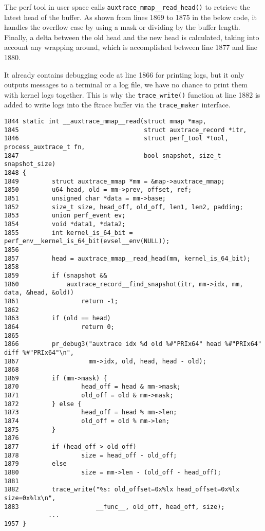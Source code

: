 \documentclass[11pt]{diazessay} %
\def\code#1{\texttt{#1}}
\begin{document}
The perf tool in user space calls \code{auxtrace\_mmap\_\_read\_head()} to
retrieve the latest head of the buffer. As shown from lines 1869 to 1875 in
the below code, it handles the overflow case by using a mask or dividing by
the buffer length. Finally, a delta between the old head and the new head is
calculated, taking into account any wrapping around, which is accomplished
between line 1877 and line 1880.

It already contains debugging code at line 1866 for printing logs, but it
only outputs messages to a terminal or a log file, we have no chance to print
them with kernel logs together.  This is why the \code{trace\_write()}
function at line 1882 is added to write logs into the ftrace buffer via the
\code{trace\_maker} interface.

\begin{lstlisting}
1844 static int __auxtrace_mmap__read(struct mmap *map,
1845                                  struct auxtrace_record *itr,
1846                                  struct perf_tool *tool, process_auxtrace_t fn,
1847                                  bool snapshot, size_t snapshot_size)
1848 {
1849         struct auxtrace_mmap *mm = &map->auxtrace_mmap;
1850         u64 head, old = mm->prev, offset, ref;
1851         unsigned char *data = mm->base;
1852         size_t size, head_off, old_off, len1, len2, padding;
1853         union perf_event ev;
1854         void *data1, *data2;
1855         int kernel_is_64_bit = perf_env__kernel_is_64_bit(evsel__env(NULL));
1856
1857         head = auxtrace_mmap__read_head(mm, kernel_is_64_bit);
1858
1859         if (snapshot &&
1860             auxtrace_record__find_snapshot(itr, mm->idx, mm, data, &head, &old))
1861                 return -1;
1862
1863         if (old == head)
1864                 return 0;
1865
1866         pr_debug3("auxtrace idx %d old %#"PRIx64" head %#"PRIx64" diff %#"PRIx64"\n",
1867                   mm->idx, old, head, head - old);
1868
1869         if (mm->mask) {
1870                 head_off = head & mm->mask;
1871                 old_off = old & mm->mask;
1872         } else {
1873                 head_off = head % mm->len;
1874                 old_off = old % mm->len;
1875         }
1876
1877         if (head_off > old_off)
1878                 size = head_off - old_off;
1879         else
1880                 size = mm->len - (old_off - head_off);
1881
1882         trace_write("%s: old_offset=0x%lx head_offset=0x%lx size=0x%lx\n",
1883                     __func__, old_off, head_off, size);
            ...
1957 }
\end{lstlisting}
\end{document}
